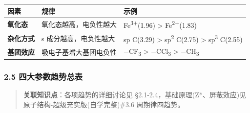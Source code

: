 \documentclass[a4paper,11pt]{ctexart}
\newcounter{none}
\newcommand{\箭}{\ensuremath{\rightarrow}}
\newcommand{\左箭}{\ensuremath{\leftarrow}}
\newcommand{\上箭}{\ensuremath{\uparrow}}
\newcommand{\下箭}{\ensuremath{\downarrow}}
\newcommand{\衡}{\ensuremath{\rightleftharpoons}}
\newcommand{\双箭}{\ensuremath{\leftrightarrow}}
\newcommand{\约等于}{\ensuremath{\approx}}
\newcommand{\小于等于}{\ensuremath{\leq}}
\newcommand{\大于等于}{\ensuremath{\geq}}
\newcommand{\不等于}{\ensuremath{\neq}}
\newcommand{\西格马}{\ensuremath{\sigma}}
\newcommand{\派}{\ensuremath{\pi}}
\begin{document}
{\def\LTcaptype{none} %
\begin{longtable}[]{@{}
  >{\raggedright\arraybackslash}p{}
  >{\raggedright\arraybackslash}p{}
  >{\raggedright\arraybackslash}p{}@{}}
\toprule\noalign{}
\begin{minipage}[b]{\linewidth}\raggedright
因素
\end{minipage} & \begin{minipage}[b]{\linewidth}\raggedright
规律
\end{minipage} & \begin{minipage}[b]{\linewidth}\raggedright
示例
\end{minipage} \\
\midrule\noalign{}
\endhead
\bottomrule\noalign{}
\endlastfoot
\textbf{氧化态} & 氧化态越高，电负性越大 & Fe\textsuperscript{3+}(1.96) \textgreater{} Fe\textsuperscript{2+}(1.83) \\
\textbf{杂化方式} & s 成分越高，电负性越大 & sp C(3.29) \textgreater{} sp\textsuperscript{2} C(2.75) \textgreater{} sp\textsuperscript{3} C(2.55) \\
\textbf{基团效应} & 吸电子基增大基团电负性 & −CF\textsubscript{3} \textgreater{} −CCl\textsubscript{3} \textgreater{} −CH\textsubscript{3} \\
\end{longtable}
}

\subsubsection{2.5 四大参数趋势总表}\label{ux56dbux5927ux53c2ux6570ux8d8bux52bfux603bux8868}

\begin{quote}
\textbf{关联知识点}：各项趋势的详细讨论见 §2.1-2.4，基础原理(Z*、屏蔽效应)见 原子结构-超级充实版(自学完整)\#3.6 周期律四趋势。
\end{quote}
\end{document}
